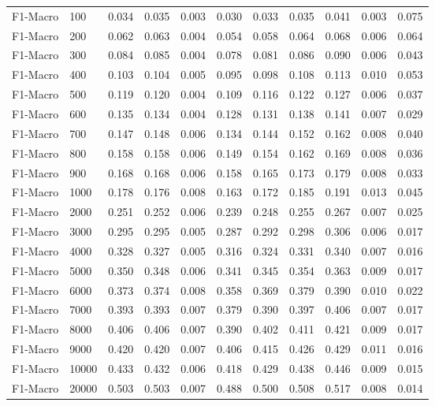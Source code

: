 \begin{table}[htbp]
\begin{table}
\begin{tabular}{ll|rrrrrrrrr}
F1-Macro & 100 & 0.034 & 0.035 & 0.003 & 0.030 & 0.033 & 0.035 & 0.041 & 0.003 & 0.075 \\
F1-Macro & 200 & 0.062 & 0.063 & 0.004 & 0.054 & 0.058 & 0.064 & 0.068 & 0.006 & 0.064 \\
F1-Macro & 300 & 0.084 & 0.085 & 0.004 & 0.078 & 0.081 & 0.086 & 0.090 & 0.006 & 0.043 \\
F1-Macro & 400 & 0.103 & 0.104 & 0.005 & 0.095 & 0.098 & 0.108 & 0.113 & 0.010 & 0.053 \\
F1-Macro & 500 & 0.119 & 0.120 & 0.004 & 0.109 & 0.116 & 0.122 & 0.127 & 0.006 & 0.037 \\
F1-Macro & 600 & 0.135 & 0.134 & 0.004 & 0.128 & 0.131 & 0.138 & 0.141 & 0.007 & 0.029 \\
F1-Macro & 700 & 0.147 & 0.148 & 0.006 & 0.134 & 0.144 & 0.152 & 0.162 & 0.008 & 0.040 \\
F1-Macro & 800 & 0.158 & 0.158 & 0.006 & 0.149 & 0.154 & 0.162 & 0.169 & 0.008 & 0.036 \\
F1-Macro & 900 & 0.168 & 0.168 & 0.006 & 0.158 & 0.165 & 0.173 & 0.179 & 0.008 & 0.033 \\
F1-Macro & 1000 & 0.178 & 0.176 & 0.008 & 0.163 & 0.172 & 0.185 & 0.191 & 0.013 & 0.045 \\
F1-Macro & 2000 & 0.251 & 0.252 & 0.006 & 0.239 & 0.248 & 0.255 & 0.267 & 0.007 & 0.025 \\
F1-Macro & 3000 & 0.295 & 0.295 & 0.005 & 0.287 & 0.292 & 0.298 & 0.306 & 0.006 & 0.017 \\
F1-Macro & 4000 & 0.328 & 0.327 & 0.005 & 0.316 & 0.324 & 0.331 & 0.340 & 0.007 & 0.016 \\
F1-Macro & 5000 & 0.350 & 0.348 & 0.006 & 0.341 & 0.345 & 0.354 & 0.363 & 0.009 & 0.017 \\
F1-Macro & 6000 & 0.373 & 0.374 & 0.008 & 0.358 & 0.369 & 0.379 & 0.390 & 0.010 & 0.022 \\
F1-Macro & 7000 & 0.393 & 0.393 & 0.007 & 0.379 & 0.390 & 0.397 & 0.406 & 0.007 & 0.017 \\
F1-Macro & 8000 & 0.406 & 0.406 & 0.007 & 0.390 & 0.402 & 0.411 & 0.421 & 0.009 & 0.017 \\
F1-Macro & 9000 & 0.420 & 0.420 & 0.007 & 0.406 & 0.415 & 0.426 & 0.429 & 0.011 & 0.016 \\
F1-Macro & 10000 & 0.433 & 0.432 & 0.006 & 0.418 & 0.429 & 0.438 & 0.446 & 0.009 & 0.015 \\
F1-Macro & 20000 & 0.503 & 0.503 & 0.007 & 0.488 & 0.500 & 0.508 & 0.517 & 0.008 & 0.014 \\

\end{tabular}
\end{table}
\end{table}

